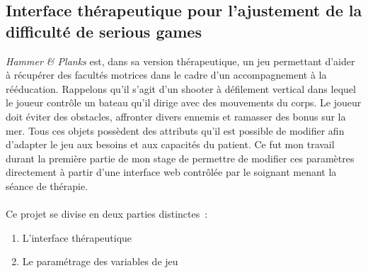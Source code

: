\subsection{Interface thérapeutique pour l'ajustement de la difficulté de serious games}	
\emph{Hammer \& Planks} est, dans sa version thérapeutique, un jeu permettant d'aider à récupérer des facultés motrices dans le cadre d'un accompagnement à la rééducation. Rappelons qu'il s'agit d'un shooter à défilement vertical dans lequel le joueur contrôle un bateau qu'il dirige avec des mouvements du corps. Le joueur doit éviter des obstacles, affronter divers ennemis et ramasser des bonus sur la mer. Tous ces objets possèdent des attributs qu'il est possible de modifier afin d'adapter le jeu aux besoins et aux capacités du patient. Ce fut mon travail durant la première partie de mon stage de permettre de modifier ces paramètres directement à partir d'une interface web contrôlée par le soignant menant la séance de thérapie.
\paragraph{}
Ce projet se divise en deux parties distinctes~:
\begin{enumerate}
	\item L'interface thérapeutique
	\item Le paramétrage des variables de jeu
\end{enumerate}

